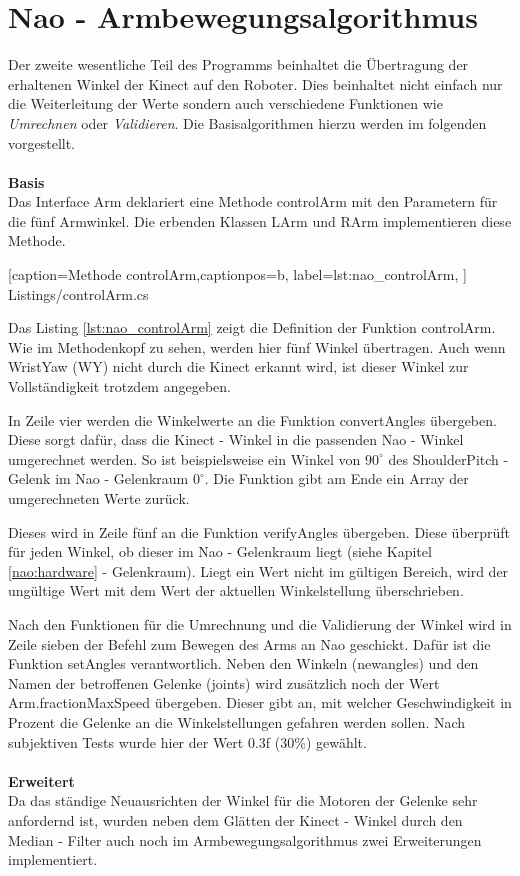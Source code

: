 \section{Nao -  Armbewegungsalgorithmus}
Der zweite wesentliche Teil des Programms beinhaltet die Übertragung der erhaltenen Winkel der Kinect auf den Roboter. Dies beinhaltet nicht einfach nur die Weiterleitung der Werte sondern auch verschiedene Funktionen wie \textit{Umrechnen} oder \textit{Validieren}. Die Basisalgorithmen hierzu werden im folgenden vorgestellt.
\\
\\
\textbf{Basis}
\\
Das Interface \textsf{Arm} deklariert eine Methode \textsf{controlArm} mit den Parametern für die fünf Armwinkel. Die erbenden Klassen \textsf{LArm} und \textsf{RArm} implementieren diese Methode. 


    [caption={Methode \textsf{controlArm}},captionpos=b,
       label=lst:nao_controlArm,
       ]	
 {Listings/controlArm.cs}

Das Listing \ref{lst:nao_controlArm} zeigt die Definition der Funktion \textsf{controlArm}. Wie im Methodenkopf zu sehen, werden hier fünf Winkel übertragen. Auch wenn WristYaw (WY) nicht durch die Kinect erkannt wird, ist dieser Winkel zur Vollständigkeit trotzdem angegeben. 

In Zeile vier werden die Winkelwerte an die Funktion \textsf{convertAngles} übergeben. Diese sorgt dafür, dass die Kinect - Winkel in die passenden Nao - Winkel umgerechnet werden. So ist beispielsweise ein Winkel von $90^\circ$ des ShoulderPitch - Gelenk im Nao -  Gelenkraum $0^\circ$. Die Funktion gibt am Ende ein Array der umgerechneten Werte zurück.

Dieses wird in Zeile fünf an die Funktion \textsf{verifyAngles} übergeben. Diese überprüft für jeden Winkel, ob dieser im Nao - Gelenkraum liegt (siehe Kapitel \ref{nao:hardware} - Gelenkraum). Liegt ein Wert nicht im gültigen Bereich, wird der ungültige Wert mit dem Wert der aktuellen Winkelstellung überschrieben.

Nach den Funktionen für die Umrechnung und die Validierung der Winkel wird in Zeile sieben der Befehl zum Bewegen des Arms an Nao geschickt. Dafür ist die Funktion \textsf{setAngles} verantwortlich. Neben den Winkeln (\textsf{newangles}) und den Namen der betroffenen Gelenke (\textsf{joints}) wird zusätzlich noch der Wert \textsf{Arm.fractionMaxSpeed} übergeben. Dieser gibt an, mit welcher Geschwindigkeit in Prozent die Gelenke an die Winkelstellungen gefahren werden sollen. Nach subjektiven Tests wurde hier der Wert 0.3f (30\%) gewählt. 
\\
\\
\textbf{Erweitert}
\\
Da das ständige Neuausrichten der Winkel für die Motoren der Gelenke sehr anfordernd ist, wurden neben dem Glätten der Kinect - Winkel durch den Median - Filter auch noch im Armbewegungsalgorithmus zwei Erweiterungen implementiert.

